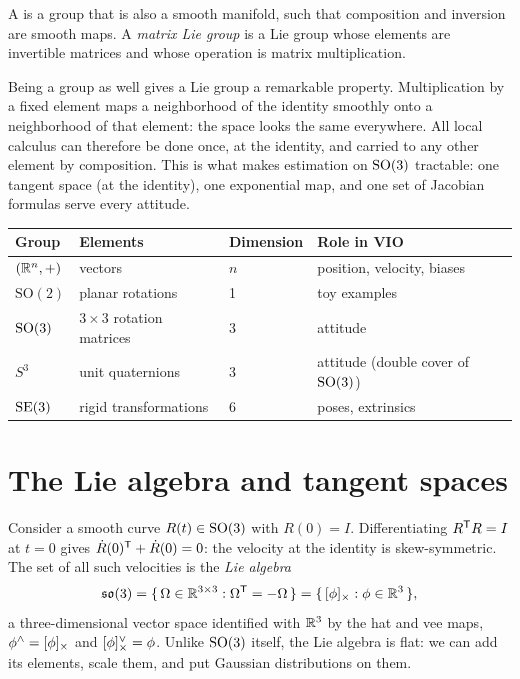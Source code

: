 \begin{definition}
A  is a group that is also a smooth manifold, such that composition and inversion are smooth maps. A \emph{matrix Lie group} is a
Lie group whose elements are invertible matrices and whose operation is matrix multiplication.
\end{definition}

Being a group as well gives a Lie group a remarkable property. Multiplication by a fixed element maps a neighborhood of the identity smoothly onto
a neighborhood of that element: the space looks the same everywhere. All local calculus can therefore be done once, at the identity, and
carried to any other element by composition. This is what makes estimation on $\mathrm{SO}(3)$ tractable: one tangent space (at the identity), one
exponential map, and one set of Jacobian formulas serve every attitude.

\begin{center}\small
\begin{tabular}{@{}l l l l@{}}
\toprule
Group & Elements & Dimension & Role in VIO \\
\midrule
$(\mathbb{R}^n, +)$ & vectors & $n$ & position, velocity, biases \\
$\mathrm{SO}(2)$ & planar rotations & 1 & toy examples \\
$\mathrm{SO}(3)$ & $3\times3$ rotation matrices & 3 & attitude \\
$S^3$ & unit quaternions & 3 & attitude (double cover of $\mathrm{SO}(3)$) \\
$\mathrm{SE}(3)$ & rigid transformations & 6 & poses, extrinsics \\
\bottomrule
\end{tabular}
\end{center}

\section{The Lie algebra and tangent spaces}

Consider a smooth curve $R(t) \in \mathrm{SO}(3)$ with $R(0) = I$. Differentiating $R^{\mathsf{T}} R = I$ at $t = 0$ gives
$\dot R(0)^{\mathsf{T}} + \dot R(0) = 0$: the velocity at the identity is skew-symmetric. The set of all such
velocities is the \emph{Lie algebra}
\begin{equation}
  \mathfrak{so}(3) = \{\, \Omega \in \mathbb{R}^{3\times3} : \Omega^{\mathsf{T}} = -\Omega \,\} = \{\, [\phi]_{\times} : \phi \in \mathbb{R}^3 \,\},
\end{equation}
a three-dimensional vector space identified with $\mathbb{R}^3$ by the hat and vee maps,
$\phi^{\wedge} = [\phi]_{\times}$ and $[\phi]_{\times}^{\vee} = \phi$. Unlike $\mathrm{SO}(3)$ itself, the Lie algebra is flat:
we can add its elements, scale them, and put Gaussian distributions on them.

